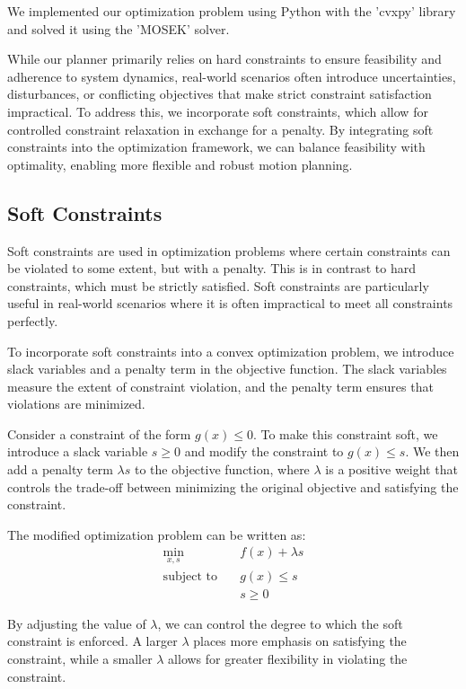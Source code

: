 We implemented our optimization problem using Python with the 'cvxpy' library and solved it using the 'MOSEK' solver.

While our planner primarily relies on hard constraints to ensure feasibility and adherence to system dynamics, real-world scenarios often introduce
uncertainties, disturbances, or conflicting objectives that make strict constraint satisfaction impractical.
To address this, we incorporate soft constraints, which allow for controlled constraint relaxation in exchange for a penalty.
By integrating soft constraints into the optimization framework, we can balance feasibility with optimality, enabling more flexible and robust motion
planning.

\subsection{Soft Constraints}

Soft constraints are used in optimization problems where certain constraints can be violated to some extent, but with a penalty.
This is in contrast to hard constraints, which must be strictly satisfied.
Soft constraints are particularly useful in real-world scenarios where it is often impractical to meet all constraints perfectly.

To incorporate soft constraints into a convex optimization problem, we introduce slack variables and a penalty term in the objective function.
The slack variables measure the extent of constraint violation, and the penalty term ensures that violations are minimized.

Consider a constraint of the form \( g(x) \leq 0 \).
To make this constraint soft, we introduce a slack variable \( s \geq 0 \) and modify the constraint to \( g(x) \leq s \).
We then add a penalty term \( \lambda s \) to the objective function, where \( \lambda \) is a positive weight that controls the trade-off between
minimizing the original objective and satisfying the constraint.

The modified optimization problem can be written as:
\begin{align*}
	\min_{x, s} \quad       & f(x) + \lambda s \\
	\text{subject to} \quad & g(x) \leq s      \\
	                        & s \geq 0
\end{align*}

By adjusting the value of \( \lambda \), we can control the degree to which the soft constraint is enforced.
A larger \( \lambda \) places more emphasis on satisfying the constraint, while a smaller \( \lambda \) allows for greater flexibility in violating
the constraint.

